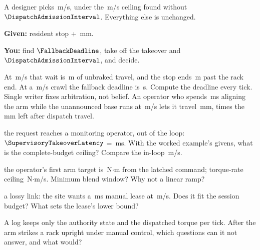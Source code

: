 \documentclass{studysheet}
\begin{document}
\begin{leftcol}
\vspace{10pt}
\begin{practicebox}
A designer picks \,m/s, under the \,m/s ceiling found without $\DispatchAdmissionInterval$.
Everything else is unchanged.\par\vspace{4pt}
\textbf{Given:} resident stop  + \,mm.\par
\textbf{You:} find $\FallbackDeadline$, take off the takeover and $\DispatchAdmissionInterval$, and decide.\par\vspace{30pt}
\end{practicebox}
\end{leftcol}%
\begin{rightcol}
%
  {At \,m/s that wait is \,m of unbraked travel, and the stop ends \,m past the
   rack end. At a \,m/s crawl the fallback deadline is \,s. Compute the deadline
   every tick.}{}
%
  {Single writer fixes arbitration, not belief. An operator who spends \,ms aligning the arm while the
   unannounced base runs at \,m/s lets it travel \,mm,  times the \,mm left after dispatch travel.}{}

\vspace{2pt}
\begin{qs}
\item \assumed{} the request reaches a monitoring operator, out of the loop: $\SupervisoryTakeoverLatency$ = \,ms. With the
  worked example's givens, what is the complete-budget ceiling? Compare the in-loop \,m/s.
\item \assumed{} the operator's first arm target is \,N$\cdot$m from the latched command;
  torque-rate ceiling \,N$\cdot$m/s. Minimum blend window? Why not a linear ramp?
\item \assumed{} a lossy link: the site wants a \,ms manual lease at \,m/s. Does it fit
  the session budget? What sets the lease's lower bound?
\item A log keeps only the authority state and the dispatched torque per tick. After the arm strikes
  a rack upright under manual control, which questions can it not answer, and what would?
\end{qs}
\end{rightcol}
\end{document}

